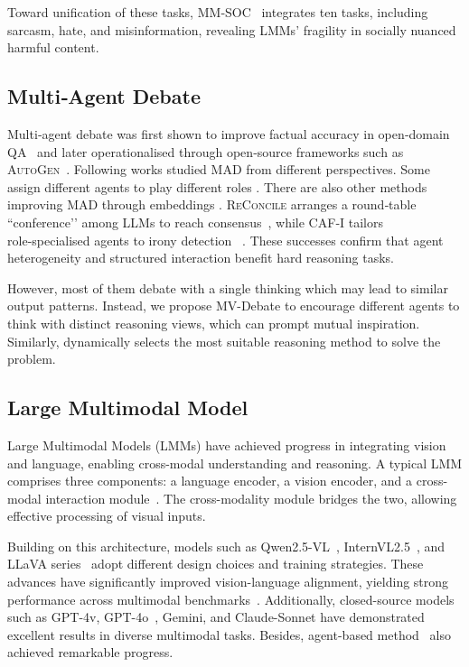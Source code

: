 \documentclass[letterpaper]{article} %
\begin{document}
Toward unification of these tasks, MM‑SOC~\cite{Jin2024MMSOC} integrates ten tasks, including sarcasm, hate, and misinformation, revealing LMMs’ fragility in socially nuanced harmful content.




\subsection{Multi‑Agent Debate}
Multi‑agent debate was first shown to improve factual accuracy in open‑domain QA~\cite{Du2023Debate} and later operationalised through open‑source frameworks such as \textsc{AutoGen}~\cite{Wu2023AutoGen}.   Following works studied MAD from different perspectives. Some assign different agents to play different roles \cite{wang2023unleashing}.  There are also other methods improving MAD through embeddings \cite{pham2023let}.
\textsc{ReConcile} arranges a round‑table “conference’’ among LLMs to reach consensus~\cite{Chen2024ReConcile},   while CAF‑I tailors role‑specialised agents to irony detection ~\cite{Liu2025CAFI}. 
These successes confirm that agent heterogeneity and structured interaction benefit hard reasoning tasks.



However, most of them debate with a single thinking which may lead to similar output patterns. Instead, we propose MV-Debate to encourage different agents to
think with distinct reasoning views, which can prompt mutual inspiration. Similarly, \cite{gao2024meta}
dynamically selects the most suitable reasoning method to solve the problem.


\subsection{Large Multimodal Model}

Large Multimodal Models (LMMs) have achieved progress in integrating vision and language, enabling cross-modal understanding and reasoning. A typical LMM comprises three components: a language encoder, a vision encoder, and a cross-modal interaction module~\cite{caffagni2024revolution,liang2022multi11,bi-etal-2025-llava,bi2025cot,bi2025prism}. The cross-modality module bridges the two, allowing effective processing of visual inputs.

Building on this architecture, models such as Qwen2.5-VL~\cite{bai2025qwen2}, InternVL2.5~\cite{chen2024expanding}, and LLaVA series~\cite{liu2023visual,li2024llava} adopt different design choices and training strategies. These advances have significantly improved vision-language alignment, yielding strong performance across multimodal benchmarks~\cite{kil2024mllm,huang2024survey}. Additionally, closed-source models such as GPT-4v, GPT-4o~\cite{hurst2024gpt}, Gemini\cite{comanici2025gemini}, and Claude-Sonnet have demonstrated excellent results in diverse multimodal tasks. Besides, agent-based method~\cite{gao2024clova,fan2024videoagent,wang2025repomaster} also achieved remarkable progress.
\end{document}
